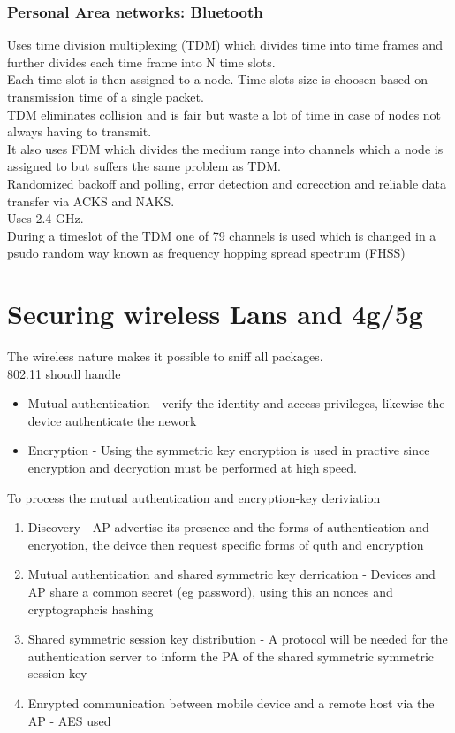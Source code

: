\documentclass[12pt, a4paper]{article}
\begin{document}
		\subsubsection{Personal Area networks: Bluetooth}
			Uses time division multiplexing (TDM) which divides time into time frames and further divides each time frame into N time slots.\\
			Each time slot is then assigned to a node. Time slots size is choosen based on transmission time of a single packet.\\
			TDM eliminates collision and is fair but waste a lot of time in case of nodes not always having to transmit.\\
			It also uses FDM which divides the medium range into channels which a node is assigned to but suffers the same problem as TDM.\\
			Randomized backoff and polling, error detection and corecction and reliable data transfer via ACKS and NAKS.\\
			Uses 2.4 GHz.\\
			During a timeslot of the TDM one of 79 channels is used which is changed in a psudo random way known as frequency hopping spread spectrum (FHSS)\\
	\section{Securing wireless Lans and 4g/5g}
		The wireless nature makes it possible to sniff all packages.\\
		802.11 shoudl handle
		\begin{itemize}
			\item Mutual authentication - verify the identity and access privileges, likewise the device authenticate the nework
			\item Encryption - Using the symmetric key encryption is used in practive since encryption and decryotion must be performed at high speed.
		\end{itemize}
		To process the mutual authentication and encryption-key deriviation
		\begin{enumerate}
			\item Discovery - AP advertise its presence and the forms of authentication and encryotion, the deivce then request specific forms of quth and encryption
			\item Mutual authentication and shared symmetric key derrication - Devices and AP share a common secret (eg password), using this an nonces and cryptographcis hashing
			\item Shared symmetric session key distribution - A protocol will be needed for the authentication server to inform the PA of the shared symmetric symmetric session key
			\item Enrypted communication between mobile device and a remote host via the AP - AES used
		\end{enumerate}
\end{document}
